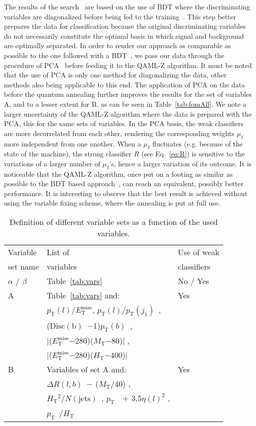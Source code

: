 \documentclass{article}
\newcommand{\pt}{\ensuremath{p_{\mathrm{T}}}~}
\newcommand{\ptl}{\ensuremath{p_{\mathrm{T}}(l)}}
\newcommand{\met}{\ensuremath{E_\mathrm{T}^\mathrm{miss}}}
\newcommand{\mt}{\ensuremath{M_{\mathrm{T}}}}
\newcommand{\Ht}{\ensuremath{H_{\mathrm{T}}}}
\newcommand{\jeti}[1]{\ensuremath{j_{#1}}}
\newcommand{\ptisr}{\ensuremath{p_{\mathrm{T}}(\jeti{1})}~}
\newcommand{\njet}{\ensuremath{N(\mathrm{jets})}~}
\newcommand{\ptb}{\ensuremath{p_{\mathrm{T}}(b)}~}
\newcommand{\bdisc}{\ensuremath{\mathrm{Disc(b)}}~}
\newcommand{\drLB}{\ensuremath{\Delta R (l, b)}~}
\begin{document}
The results of the search~\cite{st4bd} are based on the use of BDT where 
the discriminating variables are diagonalized before being fed to the 
training~\cite{RefBDT,tmva}. This step better prepares the data for 
classification because the original discriminating variables do not 
necessarily constitute the optimal basis in which signal and background 
are optimally separated. In order to render our approach as comparable as 
possible to the one followed with a BDT~\cite{st4bd}, we pass our data 
through the procedure of PCA~\cite{pca} before feeding it to the QAML-Z
algorithm. It must be noted that the use of PCA is only one method for
diagonalizing the data, other methods also being applicable to this end.
The application of PCA on the data before the quantum annealing further
improves the results for the set of variables A, and to a lesser extent
for B, as can be seen in Table~\ref{tab:fomAll}. We note a larger uncertainty
of the QAML-Z algorithm where the data is prepared with the PCA, this for
the same sets of variables. In the PCA basis, the weak classifiers are
more decorrelated from each other, rendering the corresponding weights
$\mu_I$ more independent from one another. When a $\mu_I$ fluctuates (e.g.
because of the state of the machine), the strong classifier $R$
(see Eq.~\ref{eq:R}) is sensitive to the variations of a larger number of
$\mu_I$'s, hence a larger variation of its outcome. It is noticeable that
the QAML-Z algorithm, once put on a footing as similar as possible to the
BDT based approach~\cite{st4bd}, can reach an equivalent, possibly better
performance. It is interesting to observe that the best result is achieved
without using the variable fixing scheme, where the annealing is put at
full use.

\begin{table}[!htbp]
\begin{center}  
\begin{tabular}{|l|l|l|}
\hline
\hline
Variable & List of   & Use of weak \\
set name & variables & classifiers \\
\hline
 $\alpha$ / $\beta$ & Table~\ref{tab:vars} & No / Yes  \\
 A  & Table~\ref{tab:vars} and:  & Yes  \\
    & \ptl/\met, \ptl/\ptisr, & \\
    & (\bdisc$-$1)\ptb,  & \\
    & $|$(\met$-$280)(\mt$-$80)$|$ , & \\
    & $|$(\met$-$280)(\Ht$-$400)$|$ & \\
 B  & Variables of set A and: & Yes \\
    & \drLB$-$ (\mt/40) , & \\
    & \Ht$^2$/\njet, \pt~$+$ 3.5$\eta(l)^2$ , & \\
    & \pt/\Ht & \\
\hline
\hline
\end{tabular}
\caption{Definition of different variable sets as a function of the used 
  variables.}
\label{tab:varset}
\end{center}
\end{table}
\end{document}
